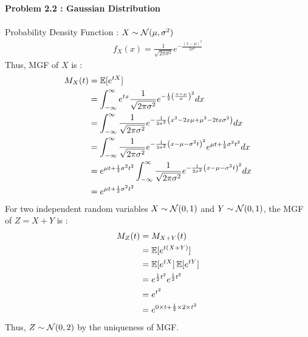 \noindent\textbf{Problem 2.2 : Gaussian Distribution} \\
\\
Probability Density Function : $X \sim \operatorname{\mathcal{N}}(\mu, \sigma^2)$ \\ 
\begin{align*}
    f_X(x) = \frac{1}{\sqrt{2\pi\sigma^2}} e^{-\frac{(x-\mu)^2}{2\sigma^2}}
\end{align*}
Thus, MGF of $X$ is :
\begin{align*}
    M_X(t) &= \operatorname{\mathbb{E}}[e^{tX}] \\
    &= \int_{ -\infty }^{ \infty } e^{tx} \frac{1}{\sqrt{2\pi\sigma^2}} e^{-\frac{1}{2} \left( \frac{x-\mu}{\sigma} \right)^2} dx \\
    &= \int_{-\infty}^{\infty} \frac{1}{\sqrt{2\pi\sigma^2}} e^{-\frac{1}{2\sigma^2} \left( x^2 -2x\mu + \mu^2 -2tx\sigma^2\right)} dx \\
    &= \int_{-\infty}^{\infty} \frac{1}{\sqrt{2\pi\sigma^2}} e^{-\frac{1}{2\sigma^2} \left( x-\mu-\sigma^2 t\right)^2} e^{\mu t + \frac{1}{2} \sigma^2 t^2} dx \\
    &= e^{\mu t + \frac{1}{2} \sigma^2 t^2} \int_{-\infty}^{\infty} \frac{1}{\sqrt{2\pi\sigma^2}} e^{-\frac{1}{2\sigma^2} \left( x-\mu-\sigma^2 t\right)^2} dx \\
    &= e^{\mu t + \frac{1}{2} \sigma^2 t^2}
\end{align*}
For two independent random variables $X \sim \operatorname{\mathcal{N}}(0, 1)$ and $Y \sim \operatorname{\mathcal{N}}(0, 1)$, the MGF of $Z = X+Y$ is :
\begin{align*}
    M_Z(t) &= M_{X+Y}(t) \\
    &= \operatorname{\mathbb{E}}[e^{t(X+Y)}] \\
    &= \operatorname{\mathbb{E}}[e^{tX}] \operatorname{\mathbb{E}}[e^{tY}] \\
    &= e^{\frac{1}{2} t^2} e^{\frac{1}{2} t^2} \\
    &= e^{t^2}\\
    &= e^{0 \times t + \frac{1}{2} \times 2 \times t^2}
\end{align*}
Thus, $Z \sim \operatorname{\mathcal{N}}(0, 2)$ by the uniqueness of MGF. \\

